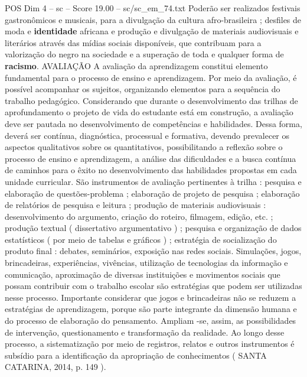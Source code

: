 \begin{textsample}{POS Dim 4 – sc – Score 19.00 – sc/sc\_em\_74.txt}
Poderão ser realizados festivais gastronômicos e musicais, para a divulgação da cultura afro-brasileira ; desfiles de moda e \textbf{identidade} africana e produção e divulgação de materiais audiovisuais e literários através das mídias sociais disponíveis, que contribuam para a valorização do negro na sociedade e a superação de toda e qualquer forma de \textbf{racismo}.
AVALIAÇÃO A avaliação da aprendizagem constitui elemento fundamental para o processo de ensino e aprendizagem.
Por meio da avaliação, é possível acompanhar os sujeitos, organizando elementos para a sequência do trabalho pedagógico.
Considerando que durante o desenvolvimento das trilhas de aprofundamento o projeto de vida do estudante está em construção, a avaliação deve ser pautada no desenvolvimento de competências e habilidades.
Dessa forma, deverá ser contínua, diagnóstica, processual e formativa, devendo prevalecer os aspectos qualitativos sobre os quantitativos, possibilitando a reflexão sobre o processo de ensino e aprendizagem, a análise das dificuldades e a busca contínua de caminhos para o êxito no desenvolvimento das habilidades propostas em cada unidade curricular.
São instrumentos de avaliação pertinentes à trilha : pesquisa e elaboração de questões-problema ; elaboração de projeto de pesquisa ; elaboração de relatórios de pesquisa e leitura ; produção de materiais audiovisuais : desenvolvimento do argumento, criação do roteiro, filmagem, edição, etc. ; produção textual ( dissertativo argumentativo ) ; pesquisa e organização de dados estatísticos ( por meio de tabelas e gráficos ) ; estratégia de socialização do produto final : debates, seminários, exposição nas redes sociais.
Simulações, jogos, brincadeiras, experiências, vivências, utilização de tecnologias da informação e comunicação, aproximação de diversas instituições e movimentos sociais que possam contribuir com o trabalho escolar são estratégias que podem ser utilizadas nesse processo.
Importante considerar que jogos e brincadeiras não se reduzem a estratégias de aprendizagem, porque são parte integrante da dimensão humana e do processo de elaboração do pensamento.
Ampliam -se, assim, as possibilidades de intervenção, questionamento e transformação da realidade.
Ao longo desse processo, a sistematização por meio de registros, relatos e outros instrumentos é subsídio para a identificação da apropriação de conhecimentos ( SANTA CATARINA, 2014, p. 149 ).

\end{textsample}
